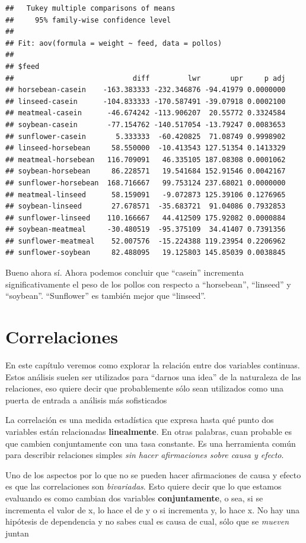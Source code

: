 \documentclass[
]{book}
\begin{document}
\begin{verbatim}
##   Tukey multiple comparisons of means
##     95% family-wise confidence level
## 
## Fit: aov(formula = weight ~ feed, data = pollos)
## 
## $feed
##                            diff         lwr       upr     p adj
## horsebean-casein    -163.383333 -232.346876 -94.41979 0.0000000
## linseed-casein      -104.833333 -170.587491 -39.07918 0.0002100
## meatmeal-casein      -46.674242 -113.906207  20.55772 0.3324584
## soybean-casein       -77.154762 -140.517054 -13.79247 0.0083653
## sunflower-casein       5.333333  -60.420825  71.08749 0.9998902
## linseed-horsebean     58.550000  -10.413543 127.51354 0.1413329
## meatmeal-horsebean   116.709091   46.335105 187.08308 0.0001062
## soybean-horsebean     86.228571   19.541684 152.91546 0.0042167
## sunflower-horsebean  168.716667   99.753124 237.68021 0.0000000
## meatmeal-linseed      58.159091   -9.072873 125.39106 0.1276965
## soybean-linseed       27.678571  -35.683721  91.04086 0.7932853
## sunflower-linseed    110.166667   44.412509 175.92082 0.0000884
## soybean-meatmeal     -30.480519  -95.375109  34.41407 0.7391356
## sunflower-meatmeal    52.007576  -15.224388 119.23954 0.2206962
## sunflower-soybean     82.488095   19.125803 145.85039 0.0038845
\end{verbatim}

Bueno ahora sí. Ahora podemos concluir que ``casein'' incrementa significativamente el peso de los pollos con respecto a ``horsebean'', ``linseed'' y ``soybean''. ``Sunflower'' es también mejor que ``linseed''.

\hypertarget{correlaciones}{%
\chapter{Correlaciones}\label{correlaciones}}

En este capítulo veremos como explorar la relación entre dos variables continuas. Estos análisis suelen ser utilizados para ``darnos una idea'' de la naturaleza de las relaciones, eso quiere decir que probablemente sólo sean utilizados como una puerta de entrada a análisis más sofisticados

La correlación es una medida estadística que expresa hasta qué punto dos variables están relacionadas \textbf{linealmente}. En otras palabras, cuan probable es que cambien conjuntamente con una tasa constante. Es una herramienta común para describir relaciones simples \emph{sin hacer afirmaciones sobre causa y efecto}.

Uno de los aspectos por lo que no se pueden hacer afirmaciones de causa y efecto es que las correlaciones son \emph{bivariadas}. Esto quiere decir que lo que estamos evaluando es como cambian dos variables \textbf{conjuntamente}, o sea, si se incrementa el valor de x, lo hace el de y o si incrementa y, lo hace x. No hay una hipótesis de dependencia y no sabes cual es causa de cual, sólo que se \emph{mueven} juntan
\end{document}
